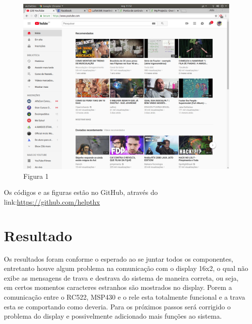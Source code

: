 \documentclass[conference,compsoc]{IEEEtran}
\begin{document}
\begin{figure}[!ht]
		\centering
		\includegraphics[scale=0.15]{nome_da_figura1.png}
		\caption{Figura 1}
\end{figure}

Os códigos e as figuras estão no GitHub, através do link:\href{https://github.com/helpthx}{https://github.com/helpthx}


\section{Resultado}
Os resultados foram conforme o esperado ao se juntar todos os componentes, entretanto houve algum problema na comunicação com o display 16x2, o qual não exibe as mensagens de trava e destrava do sistema de maneira correta, ou seja, em certos momentos caracteres estranhos são mostrados no display. Porem a comunicação entre o RC522, MSP430 e o rele esta totalmente funcional e a trava esta se comportando como deveria. Para os próximos passos será corrigido o problema do display e possivelmente adicionado mais funções ao sistema.
\end{document}
